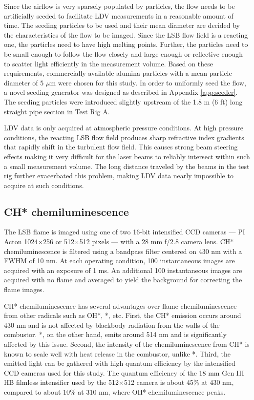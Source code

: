 Since the airflow is very sparsely populated by particles, the flow needs to be artificially seeded to facilitate LDV measurements in a reasonable amount of time.
The seeding particles to be used and their mean diameter are decided by the characteristics of the flow to be imaged.\cite{1997-melling}
Since the LSB flow field is a reacting one, the particles need to have high melting points.
Further, the particles need to be small enough to follow the flow closely and large enough or reflective enough to scatter light efficiently in the measurement volume.
Based on these requirements, commercially available alumina particles with a mean particle diameter of 5 \(\mu\)m were chosen for this study.
In order to uniformly seed the flow, a novel seeding generator was designed as described in Appendix \ref{app:seeder}.
The seeding particles were introduced slightly upstream of the 1.8 m (6 ft) long straight pipe section in Test Rig A.

LDV data is only acquired at atmospheric pressure conditions.
At high pressure conditions, the reacting LSB flow field produces sharp refractive index gradients that rapidly shift in the turbulent flow field.
This causes strong beam steering effects making it very difficult for the laser beams to reliably intersect within such a small measurement volume.
The long distance traveled by the beams in the test rig further exacerbated this problem, making LDV data nearly impossible to acquire at such conditions.

\subsection{CH* chemiluminescence}

The LSB flame is imaged using one of two 16-bit intensified CCD cameras --- PI Acton 1024\(\times\)256 or 512\(\times\)512 pixels --- with a 28 mm f/2.8 camera lens.
CH* chemiluminescence is filtered using a bandpass filter centered on 430 nm with a FWHM of 10 nm.
At each operating condition, 100 instantaneous images are acquired with an exposure of 1 ms.
An additional 100 instantaneous images are acquired with no flame and averaged to yield the background for correcting the flame images.

CH* chemiluminescence has several advantages over flame chemiluminescence from other radicals such as OH*, *, etc.
First, the CH* emission occurs around 430 nm and is not affected by blackbody radiation from the walls of the combustor.
*, on the other hand, emits around 514 nm and is significantly affected by this issue.
Second, the intensity of the chemiluminescence from CH* is known to scale well with heat release in the combustor\cite{2006-hardalupas}, unlike *.
Third, the emitted light can be gathered with high quantum efficiency by the intensified CCD cameras used for this study.
The quantum efficiency of the 18 mm Gen III HB filmless intensifier used by the 512\(\times\)512 camera is about 45\% at 430 nm, compared to about 10\% at 310 nm, where OH* chemiluminescence peaks.

